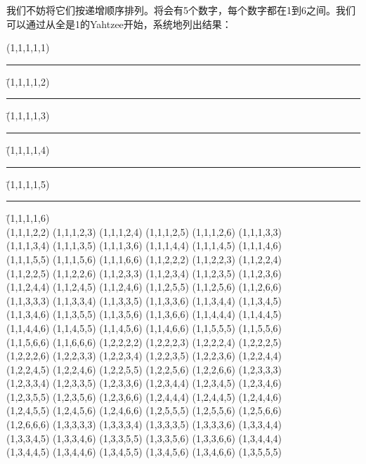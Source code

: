 我们不妨将它们按递增顺序排列。将会有5个数字，每个数字都在1到6之间。我们可以通过从全是1的Yahtzee开始，系统地列出结果：

\begin{tabbing}
(1,1,1,1,1) \rule{8pt}{0pt} \= (1,1,1,1,2) \rule{8pt}{0pt} \= (1,1,1,1,3) \rule{8pt}{0pt} \= (1,1,1,1,4) \rule{8pt}{0pt} \= (1,1,1,1,5) \rule{8pt}{0pt} \= (1,1,1,1,6) \\ 
(1,1,1,2,2) \> (1,1,1,2,3) \> (1,1,1,2,4) \> (1,1,1,2,5) \> (1,1,1,2,6) \> (1,1,1,3,3) \\ 
(1,1,1,3,4) \> (1,1,1,3,5) \> (1,1,1,3,6) \> (1,1,1,4,4) \> (1,1,1,4,5) \> (1,1,1,4,6) \\ 
(1,1,1,5,5) \> (1,1,1,5,6) \> (1,1,1,6,6) \> (1,1,2,2,2) \> (1,1,2,2,3) \> (1,1,2,2,4) \\ 
(1,1,2,2,5) \> (1,1,2,2,6) \> (1,1,2,3,3) \> (1,1,2,3,4) \> (1,1,2,3,5) \> (1,1,2,3,6) \\ 
(1,1,2,4,4) \> (1,1,2,4,5) \> (1,1,2,4,6) \> (1,1,2,5,5) \> (1,1,2,5,6) \> (1,1,2,6,6) \\ 
(1,1,3,3,3) \> (1,1,3,3,4) \> (1,1,3,3,5) \> (1,1,3,3,6) \> (1,1,3,4,4) \> (1,1,3,4,5) \\ 
(1,1,3,4,6) \> (1,1,3,5,5) \> (1,1,3,5,6) \> (1,1,3,6,6) \> (1,1,4,4,4) \> (1,1,4,4,5) \\ 
(1,1,4,4,6) \> (1,1,4,5,5) \> (1,1,4,5,6) \> (1,1,4,6,6) \> (1,1,5,5,5) \> (1,1,5,5,6) \\ 
(1,1,5,6,6) \> (1,1,6,6,6) \> (1,2,2,2,2) \> (1,2,2,2,3) \> (1,2,2,2,4) \> (1,2,2,2,5) \\ 
(1,2,2,2,6) \> (1,2,2,3,3) \> (1,2,2,3,4) \> (1,2,2,3,5) \> (1,2,2,3,6) \> (1,2,2,4,4) \\ 
(1,2,2,4,5) \> (1,2,2,4,6) \> (1,2,2,5,5) \> (1,2,2,5,6) \> (1,2,2,6,6) \> (1,2,3,3,3) \\ 
(1,2,3,3,4) \> (1,2,3,3,5) \> (1,2,3,3,6) \> (1,2,3,4,4) \> (1,2,3,4,5) \> (1,2,3,4,6) \\ 
(1,2,3,5,5) \> (1,2,3,5,6) \> (1,2,3,6,6) \> (1,2,4,4,4) \> (1,2,4,4,5) \> (1,2,4,4,6) \\ 
(1,2,4,5,5) \> (1,2,4,5,6) \> (1,2,4,6,6) \> (1,2,5,5,5) \> (1,2,5,5,6) \> (1,2,5,6,6) \\ 
(1,2,6,6,6) \> (1,3,3,3,3) \> (1,3,3,3,4) \> (1,3,3,3,5) \> (1,3,3,3,6) \> (1,3,3,4,4) \\ 
(1,3,3,4,5) \> (1,3,3,4,6) \> (1,3,3,5,5) \> (1,3,3,5,6) \> (1,3,3,6,6) \> (1,3,4,4,4) \\ 
(1,3,4,4,5) \> (1,3,4,4,6) \> (1,3,4,5,5) \> (1,3,4,5,6) \> (1,3,4,6,6) \> (1,3,5,5,5) \\ 

\end{tabbing}
